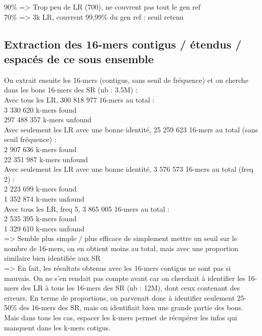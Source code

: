\documentclass[12pt]{article}
\begin{document}
90\% => Trop peu de LR (700), ne couvrent pas tout le gen ref \\

70\% => 3k LR, couvrent 99,99\% du gen ref : seuil retenu \\


\subsection{Extraction des 16-mers contigus / étendus / espacés de ce sous ensemble}

On extrait ensuite les 16-mers (contigus, sans seuil de fréquence) et on cherche dans les bons 16-mers des SR (nb : 3.5M) : \\

Avec tous les LR, 300 818 977 16-mers au total : \\

3 330 620 k-mers found \\
297 488 357 k-mers unfound \\

Avec seulement les LR avec une bonne identité, 25 259 623 16-mers au total (sans seuil fréquence) : \\

2 907 636 k-mers found \\
22 351 987 k-mers unfound \\

Avec seulement les LR avec une bonne identité, 3 576 573 16-mers au total (freq 2) : \\

2 223 699 k-mers found \\ 
1 352 874 k-mers unfound \\

Avec tous les LR, freq 5, 3 865 005 16-mers au total : \\

2 535 395 k-mers found \\
1 329 610 k-mers unfound \\

=> Semble plus simple / plus efficace de simplement mettre un seuil sur le nombre de 16-mers, on en obtient moins au total, mais
avec une proportion similaire bien identifiée aux SR \\

=> En fait, les résultats obtenus avec les 16-mers contigus ne sont pas si mauvais. On ne s'en rendait pas compte avant car on 
cherchait à identifier les 16-mers des LR à tous les 16-mers des SR (nb : 12M), dont ceux contenant des erreurs. En terme de 
proportions, on parvenait donc à identifier seulement 25-50\% des 16-mers des SR, mais on identifiait bien une grande partie des bons.
Mais dans tous les cas, espacer les k-mers permet de récupérer les infos qui manquent dans les k-mers cotigus.
\end{document}
